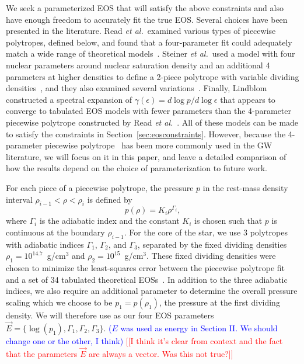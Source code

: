 \documentclass[twocolumn,prd,amssymb,aps,nofootinbib,showpacs,epsf]{revtex4}
\newcommand\ben[2]{\textcolor{red}{{#1}\sout{#2}}}
\newcommand\les[2]{\textcolor{blue}{{#1}\sout{#2}}}
\begin{document}
We seek a parameterized EOS that will satisfy the above constraints and also have enough freedom to accurately fit the true EOS. Several choices have been presented in the literature. Read {\it et al.}\ examined various types of piecewise polytropes, defined below, and found that a four-parameter fit could adequately match a wide range of theoretical models~\cite{ReadLackey2009}. Steiner {\it et al.}\ used a model with four nuclear parameters around nuclear saturation density and an additional 4 parameters at higher densities to define a 2-piece polytrope with variable dividing densities~\cite{SteinerLattimerBrown2010}, and they also examined several variations~\cite{SteinerLattimerBrown2013}. Finally, Lindblom constructed a spectral expansion of $\gamma(\epsilon) = d\log p / d\log \epsilon$ that appears to converge to tabulated EOS models with fewer parameters than the 4-parameter piecewise polytrope constructed by Read {\it et al.}~\cite{Lindblom2010}. All of these models can be made to satisfy the constraints in Section~\ref{sec:eosconstraints}. However, because the 4-parameter piecewise polytrope~\cite{ReadLackey2009} has been more commonly used in the GW literature, we will focus on it in this paper, and leave a detailed comparison of how the results depend on the choice of parameterization to future work.

For each piece of a piecewise polytrope, the pressure $p$ in the rest-mass density interval $\rho_{i-1} < \rho < \rho_i$ is defined by
\begin{equation}
p(\rho) = K_i \rho^{\Gamma_i},
\end{equation}
where $\Gamma_i$ is the adiabatic index and the constant $K_i$ is chosen such that $p$ is continuous at the boundary $\rho_{i-1}$. For the core of the star, we use 3 polytropes with adiabatic indices $\Gamma_1$, $\Gamma_2$, and $\Gamma_3$, separated by the fixed dividing densities $\rho_1 = 10^{14.7}$~g/cm$^3$ and $\rho_2 = 10^{15}$~g/cm$^3$. These fixed dividing densities were chosen to minimize the least-squares error between the piecewise polytrope fit and a set of 34 tabulated theoretical EOSs~\cite{ReadLackey2009}. In addition to the three adiabatic indices, we also require an additional parameter to determine the overall pressure scaling which we choose to be $p_1 = p(\rho_1)$, the pressure at the first dividing density. We will therefore use as our four EOS parameters $\vec E = \{\log(p_1), \Gamma_1, \Gamma_2, \Gamma_3\}$. \les{($E$ was used as energy in Section II.  We should change one or the other, I think)}{} \ben{[[I think it's clear from context and the fact that the parameters $\vec E$ are always a vector. Was this not true?]]}{}
\end{document}
